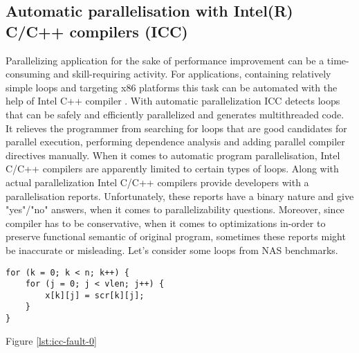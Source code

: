 \subsection{Automatic parallelisation with Intel(R) C/C++ compilers (ICC)}
\qquad Parallelizing application for the sake of performance improvement can be a time-consuming and skill-requiring activity. For applications, containing relatively simple loops and targeting x86 platforms this task can be automated with the help of Intel C++ compiler \cite{intel-multithreading-guide}. With automatic parallelization ICC detects loops that can be safely and efficiently parallelized and generates multithreaded code. It relieves the programmer from searching for loops that are good candidates for parallel execution, performing dependence analysis and adding parallel compiler directives manually.\newline 
\null\qquad When it comes to automatic program parallelisation, Intel C/C++ compilers are apparently limited to certain types of loops. \newline \null\qquad Along with actual parallelization Intel C/C++ compilers provide developers with a parallelisation reports. Unfortunately, these reports have a binary nature and give "yes"/"no" answers, when it comes to parallelizability questions. Moreover, since compiler has to be conservative, when it comes to optimizations in-order to preserve functional semantic of original program, sometimes these reports might be inaccurate or misleading. Let's consider some loops from NAS benchmarks.\newline
\begin{lstlisting}[caption={Code illustrating the notion of control dependence. Statement $S_{2}$ is control-dependent on the statement $S_{1}$.}, captionpos=b, label=lst:icc-fault-0, float, floatplacement=H, mathescape=true]
for (k = 0; k < n; k++) {
	for (j = 0; j < vlen; j++) {
		x[k][j] = scr[k][j];
	}
}
\end{lstlisting}
\qquad Figure \ref{lst:icc-fault-0}
